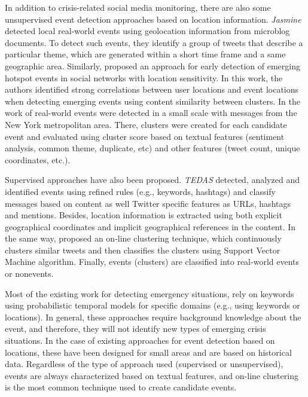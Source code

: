 \documentclass[sigconf]{acmart}
\begin{document}
In addition to crisis-related social media monitoring, there are also some unsupervised event detection approaches based on location information. \textit{Jasmine} \cite{watanabe2011jasmine} detected local real-world events using geolocation information from microblog documents. To detect such events, they identify a group of tweets that describe a particular theme, which are generated within a short time frame and a same geographic area. Similarly, \citeauthor*{unankard2015emerging} \cite{unankard2015emerging} proposed an approach for early detection of emerging hotspot events in social networks with location sensitivity. In this work, the authors identified strong correlations between user locations and event locations when detecting emerging events using content similarity between clusters. In the work of \citeauthor{walther2013geo} \cite{walther2013geo} real-world events were detected in a small scale with messages from the New York metropolitan area. There, clusters were created for each candidate event and evaluated using cluster score based on textual features (sentiment analysis, common theme, duplicate, etc) and other features (tweet count, unique coordinates, etc.).

Supervised approaches have also been proposed. \textit{TEDAS} \cite{li2012tedas} detected, analyzed and identified events using refined rules (e.g., keywords, hashtags) and classify messages based on content as well Twitter specific features as URLs, hashtags and mentions. Besides, location information is extracted using both explicit geographical coordinates and implicit geographical references in the content. In the same way, \citeauthor{becker2011beyond} \cite{becker2011beyond} proposed an on-line clustering technique, which continuously clusters similar tweets and then classifies the clusters using Support Vector Machine algorithm. Finally, events (clusters) are classified into real-world events or nonevents.

\medskip

 Most of the existing work for detecting emergency situations, rely on keywords using probabilistic temporal models for specific domains (e.g., using keywords or locations). In general, these approaches require background knowledge about the event, and therefore, they will not identify new types of emerging crisis situations. In the case of existing approaches for event detection based on locations, these have been designed for small areas and are based on historical data. Regardless of the type of approach used (supervised or unsupervised), events are always characterized based on textual features, and on-line clustering is the most common technique used to create candidate events.
\end{document}
